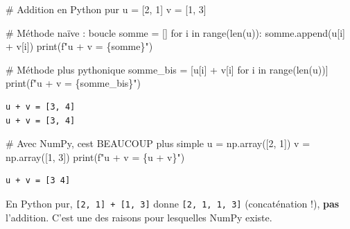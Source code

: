 \documentclass[
  french,
  11pt,
  a4paper,
]{scrbook}
\newenvironment{Shaded}{}{}
\newcommand{\BuiltInTok}[1]{\textcolor[rgb]{0.84,0.23,0.29}{#1}}
\newcommand{\CommentTok}[1]{\textcolor[rgb]{0.42,0.45,0.49}{#1}}
\newcommand{\ControlFlowTok}[1]{\textcolor[rgb]{0.84,0.23,0.29}{#1}}
\newcommand{\DecValTok}[1]{\textcolor[rgb]{0.00,0.36,0.77}{#1}}
\newcommand{\KeywordTok}[1]{\textcolor[rgb]{0.84,0.23,0.29}{#1}}
\newcommand{\NormalTok}[1]{\textcolor[rgb]{0.14,0.16,0.18}{#1}}
\newcommand{\OperatorTok}[1]{\textcolor[rgb]{0.14,0.16,0.18}{#1}}
\newcommand{\SpecialCharTok}[1]{\textcolor[rgb]{0.00,0.36,0.77}{#1}}
\newcommand{\SpecialStringTok}[1]{\textcolor[rgb]{0.01,0.18,0.38}{#1}}
\begin{document}
\begin{Shaded}
\begin{Highlighting}[]
\CommentTok{\# Addition en Python pur}
\NormalTok{u }\OperatorTok{=}\NormalTok{ [}\DecValTok{2}\NormalTok{, }\DecValTok{1}\NormalTok{]}
\NormalTok{v }\OperatorTok{=}\NormalTok{ [}\DecValTok{1}\NormalTok{, }\DecValTok{3}\NormalTok{]}

\CommentTok{\# Méthode naïve : boucle}
\NormalTok{somme }\OperatorTok{=}\NormalTok{ []}
\ControlFlowTok{for}\NormalTok{ i }\KeywordTok{in} \BuiltInTok{range}\NormalTok{(}\BuiltInTok{len}\NormalTok{(u)):}
\NormalTok{    somme.append(u[i] }\OperatorTok{+}\NormalTok{ v[i])}
\BuiltInTok{print}\NormalTok{(}\SpecialStringTok{f"u + v = }\SpecialCharTok{\{}\NormalTok{somme}\SpecialCharTok{\}}\SpecialStringTok{"}\NormalTok{)}

\CommentTok{\# Méthode plus pythonique}
\NormalTok{somme\_bis }\OperatorTok{=}\NormalTok{ [u[i] }\OperatorTok{+}\NormalTok{ v[i] }\ControlFlowTok{for}\NormalTok{ i }\KeywordTok{in} \BuiltInTok{range}\NormalTok{(}\BuiltInTok{len}\NormalTok{(u))]}
\BuiltInTok{print}\NormalTok{(}\SpecialStringTok{f"u + v = }\SpecialCharTok{\{}\NormalTok{somme\_bis}\SpecialCharTok{\}}\SpecialStringTok{"}\NormalTok{)}
\end{Highlighting}
\end{Shaded}

\begin{verbatim}
u + v = [3, 4]
u + v = [3, 4]
\end{verbatim}

\begin{Shaded}
\begin{Highlighting}[]
\CommentTok{\# Avec NumPy, c\textquotesingle{}est BEAUCOUP plus simple}
\NormalTok{u }\OperatorTok{=}\NormalTok{ np.array([}\DecValTok{2}\NormalTok{, }\DecValTok{1}\NormalTok{])}
\NormalTok{v }\OperatorTok{=}\NormalTok{ np.array([}\DecValTok{1}\NormalTok{, }\DecValTok{3}\NormalTok{])}
\BuiltInTok{print}\NormalTok{(}\SpecialStringTok{f"u + v = }\SpecialCharTok{\{}\NormalTok{u }\OperatorTok{+}\NormalTok{ v}\SpecialCharTok{\}}\SpecialStringTok{"}\NormalTok{)}
\end{Highlighting}
\end{Shaded}

\begin{verbatim}
u + v = [3 4]
\end{verbatim}

\begin{tcolorbox}[enhanced jigsaw, arc=.35mm, bottomrule=.15mm, bottomtitle=1mm, breakable, colback=white, colbacktitle=quarto-callout-warning-color!10!white, colframe=quarto-callout-warning-color-frame, coltitle=black, left=2mm, leftrule=.75mm, opacityback=0, opacitybacktitle=0.6, rightrule=.15mm, title=\textcolor{quarto-callout-warning-color}{\faExclamationTriangle}\hspace{0.5em}{⚠️ Piège classique}, titlerule=0mm, toprule=.15mm, toptitle=1mm]

En Python pur, \texttt{{[}2,\ 1{]}\ +\ {[}1,\ 3{]}} donne
\texttt{{[}2,\ 1,\ 1,\ 3{]}} (concaténation !), \textbf{pas} l'addition.
C'est une des raisons pour lesquelles NumPy existe.

\end{tcolorbox}
\end{document}
